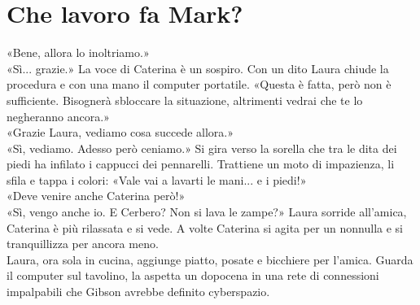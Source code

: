\chapter{Che lavoro fa Mark?}
«Bene, allora lo inoltriamo.»\\
«Sì... grazie.» La voce di Caterina \`e un sospiro. Con un dito Laura chiude la procedura e con una mano il computer portatile. «Questa \`e fatta, per\`o non \`e sufficiente. Bisognerà sbloccare la situazione, altrimenti vedrai che te lo negheranno ancora.»\\
«Grazie Laura, vediamo cosa succede allora.»\\
«Sì, vediamo. Adesso per\`o ceniamo.» Si gira verso la sorella che  tra le dita dei piedi ha infilato  i cappucci dei pennarelli. Trattiene un moto di impazienza, li sfila  e  tappa i colori:  «Vale vai a lavarti le mani... e i piedi!»\\
«Deve venire anche Caterina per\`o!»\\
«Sì, vengo anche  io. E Cerbero? Non si lava le zampe?» Laura sorride all'amica, Caterina \`e pi\`u rilassata e si vede. A volte Caterina si agita per un nonnulla e si tranquillizza per ancora meno.\\
Laura, ora sola in cucina, aggiunge piatto, posate e bicchiere per l'amica. Guarda il computer sul tavolino, la aspetta un dopocena in una rete di connessioni impalpabili che Gibson avrebbe definito cyberspazio.

